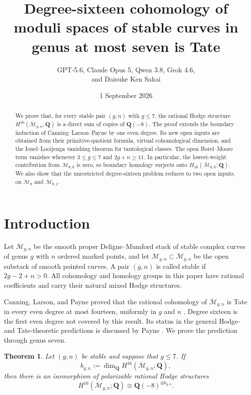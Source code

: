 \documentclass[12pt,reqno]{amsart}
\title[Degree-sixteen cohomology in genus at most seven]
  {Degree-sixteen cohomology of moduli spaces of stable curves in genus at
   most seven is Tate}
\author[GPT-5.6 et al.]
  {GPT-5.6, Claude Opus 5, Qwen 3.8, Grok 4.6,\\
   and Daisuke Ken Sakai}
\date{1 September 2026}
\newcommand{\Q}{\mathbf{Q}}
\newcommand{\M}{\mathcal{M}}
\newcommand{\Mbar}{\overline{\mathcal{M}}}
\newtheorem{theorem}{Theorem}[section]
\theoremstyle{definition}
\theoremstyle{remark}
\begin{document}
\begin{abstract}
We prove that, for every stable pair $(g,n)$ with $g\leq7$, the rational
Hodge structure $H^{16}(\overline{\mathcal M}_{g,n};\Q)$ is a direct sum of
copies of $\Q(-8)$.  The proof extends the boundary induction of
Canning--Larson--Payne by one even degree.  Its new open inputs are obtained
from their primitive-quotient formula, virtual cohomological dimension, and
the Ionel--Looijenga vanishing theorem for tautological classes.  The open Borel--Moore
term vanishes whenever $3\leq g\leq7$ and $2g+n\geq11$.  In particular, the
lowest-weight contribution from $\mathcal M_{6,6}$ is zero, so boundary
homology surjects onto $H_{16}(\overline{\mathcal M}_{6,6};\Q)$.  We also
show that the unrestricted degree-sixteen problem reduces to two open
inputs, on $\mathcal M_{8}$ and $\mathcal M_{8,1}$.
\end{abstract}

\maketitle

\section{Introduction}

Let $\Mbar_{g,n}$ be the smooth proper Deligne--Mumford stack of stable
complex curves of genus $g$ with $n$ ordered marked points, and let
$\M_{g,n}\subset\Mbar_{g,n}$ be the open substack of smooth pointed curves.
A pair $(g,n)$ is called stable if $2g-2+n>0$.  All cohomology and homology
groups in this paper have rational coefficients and carry their natural
mixed Hodge structures.

Canning, Larson, and Payne proved that the rational cohomology of
$\Mbar_{g,n}$ is Tate in every even degree at most fourteen, uniformly in
$g$ and $n$ \cite[Theorem~1.5(3) and the discussion following it]{CLP}.
Degree sixteen is the first even degree not covered by this result.  Its
status in the general Hodge- and Tate-theoretic predictions is discussed by
Payne \cite[Section~4]{PayneSurvey}.  We prove the prediction through genus
seven.

\begin{theorem}\label{thm:main}
Let $(g,n)$ be stable and suppose that $g\leq7$.  If
\[
  b_{g,n}:=\dim_{\Q}H^{16}(\Mbar_{g,n};\Q),
\]
then there is an isomorphism of polarizable rational Hodge structures
\begin{equation}\label{eq:main}
  H^{16}(\Mbar_{g,n};\Q)
  \cong \Q(-8)^{\oplus b_{g,n}}.
\end{equation}
\end{theorem}
\end{document}
